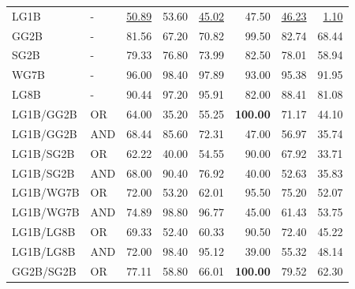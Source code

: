 \documentclass{article}
\begin{document}
{\begin{longtable}{llrrrrrr}
 LG1B                     & -       & \underline{50.89} & 53.60             & \underline{45.02} & 47.50             & \underline{46.23} & \underline{1.10} \\
 GG2B                     & -       & 81.56             & 67.20             & 70.82             & 99.50             & 82.74             & 68.44            \\
 SG2B                     & -       & 79.33             & 76.80             & 73.99             & 82.50             & 78.01             & 58.94            \\
 WG7B                     & -       & 96.00             & 98.40             & 97.89             & 93.00             & 95.38             & 91.95            \\
 LG8B                     & -       & 90.44             & 97.20             & 95.91             & 82.00             & 88.41             & 81.08            \\
 LG1B/GG2B                & OR      & 64.00             & 35.20             & 55.25             & \textbf{100.00}   & 71.17             & 44.10            \\
 LG1B/GG2B                & AND     & 68.44             & 85.60             & 72.31             & 47.00             & 56.97             & 35.74            \\
 LG1B/SG2B                & OR      & 62.22             & 40.00             & 54.55             & 90.00             & 67.92             & 33.71            \\
 LG1B/SG2B                & AND     & 68.00             & 90.40             & 76.92             & 40.00             & 52.63             & 35.83            \\
 LG1B/WG7B                & OR      & 72.00             & 53.20             & 62.01             & 95.50             & 75.20             & 52.07            \\
 LG1B/WG7B                & AND     & 74.89             & 98.80             & 96.77             & 45.00             & 61.43             & 53.75            \\
 LG1B/LG8B                & OR      & 69.33             & 52.40             & 60.33             & 90.50             & 72.40             & 45.22            \\
 LG1B/LG8B                & AND     & 72.00             & 98.40             & 95.12             & 39.00             & 55.32             & 48.14            \\
 GG2B/SG2B                & OR      & 77.11             & 58.80             & 66.01             & \textbf{100.00}   & 79.52             & 62.30            \\

\end{longtable}}
\end{document}
